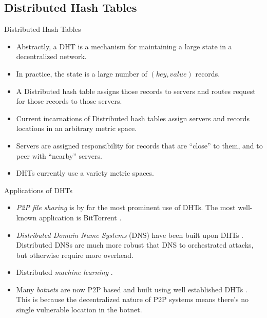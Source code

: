 \documentclass[8pt]{beamer}
\begin{document}
	\subsection{Distributed Hash Tables}
	\begin{frame}{Distributed Hash Tables}
		\begin{itemize}
			\item Abstractly, a DHT is a mechanism for maintaining a large state in a decentralized network.
			\item In practice, the state is a large number of $ (key, value) $ records.
			\item A Distributed hash table assigns those records to servers and routes request for those records to those servers.
			\item Current incarnations of Distributed hash tables assign servers and records locations in an arbitrary metric space.
			\item Servers are assigned responsibility for records that are ``close'' to them, and to peer with ``nearby'' servers.
			\item DHTs currently use a variety metric spaces.
		\end{itemize}


	\end{frame}

	\begin{frame}{Applications of DHTs}
		\begin{itemize}
			\item \textit{P2P file sharing} is by far the most prominent use of DHTs.  
			The most well-known application is BitTorrent \cite{bittorrent}.
			\item \textit{Distributed Domain Name Systems} (DNS) have been built upon DHTs \cite{cox2002serving} \cite{pappas2006comparative}.
			Distributed DNSs are much more robust that DNS to orchestrated attacks, but otherwise require more overhead.
			\item Distributed \textit{machine learning} \cite{liparameter}.
			\item Many \textit{botnets} are now P2P based and built using well established DHTs \cite{saad2011detecting}. 
			This is because the decentralized nature of P2P systems means there's no single vulnerable location in the botnet.
		\end{itemize}
	\end{frame}
\end{document}
